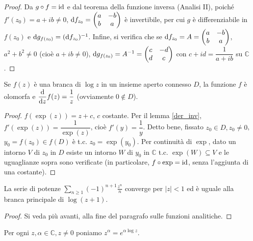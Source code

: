 \begin{proof}
  Da $g \circ f=\operatorname{id}$ e dal teorema della funzione inversa (Analisi II), poiché $f'(z_0)=a+ib\not=0$, $\mathop{}\!\mathrm{d} f_{z_0}=\begin{pmatrix}
  a & -b\\
  b & a
\end{pmatrix}$ è invertibile, per cui $g$ è differenziabile in $f(z_0)$ e $\mathop{}\!\mathrm{d} g_{f(z_0)}=(\mathop{}\!\mathrm{d} f_{z_0})^{-1}$. Infine, si verifica che se $\mathop{}\!\mathrm{d} f_{z_0}=A=\begin{pmatrix}
a & -b\\
b & a
\end{pmatrix}$, $a^2+b^2\not=0$ (cioè $a+ib\not=0$), $\mathop{}\!\mathrm{d} g_{f(z_0)}=A^{-1}=\begin{pmatrix}
  c & -d\\
  d & c
\end{pmatrix}$ con $c+id=\dfrac{1}{a+ib}$ su $\mathbb{C}$.
\end{proof}

\begin{prop}
  Se $f(z)$ è una branca di $\log{z}$ in un insieme aperto connesso $D$, la funzione $f$ è olomorfa e $\dfrac{\mathop{}\!\mathrm{d}}{\mathop{}\!\mathrm{d} z}f(z)=\dfrac{1}{z}$ (ovviamente $0 \not\in D$).
\end{prop}

\begin{proof}
  $f(\exp(z))=z+c$, $c$ costante. Per il lemma \ref{der_inv}, $f'(\exp(z))=\dfrac{1}{\exp(z)}$, cioè $f'(y)=\dfrac{1}{y}$.
  Detto bene, fissato $z_0 \in D, z_0\not=0$, $y_0=f(z_0) \in f(D)$ è t.c. $z_0=\exp(y_0)$. Per continuità di $\exp$, dato un intorno $V$ di $z_0$ in $D$ esiste un intorno $W$ di $y_0$ in $\mathbb{C}$ t.c. $\exp(W) \subseteq V$ e le uguaglianze sopra sono verificate (in particolare, $f \circ \exp=\operatorname{id}$, senza l'aggiunta di una costante).
\end{proof}

\begin{prop} \label{serie_log}
  La serie di potenze $\displaystyle \sum_{n \ge 1} (-1)^{n+1}\frac{z^n}{n}$ converge per $|z|<1$ ed è uguale alla branca principale di $\log{(z+1)}$.
\end{prop}

\begin{proof}
  Si veda più avanti, alla fine del paragrafo sulle funzioni analitiche.
\end{proof}

\begin{defn}
  Per ogni $z, \alpha \in \mathbb{C}, z \not=0$ poniamo $z^{\alpha}=e^{\alpha\log{z}}$.
\end{defn}
